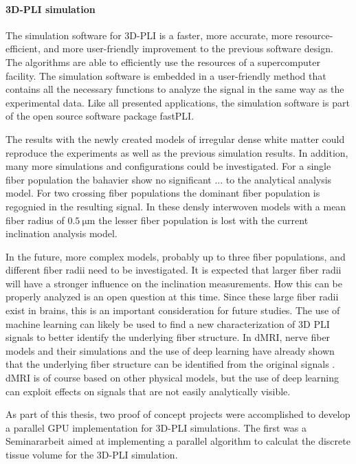 \paragraph{\acs{3D-PLI} simulation} %
The simulation software for \ac{3D-PLI} is a faster, more accurate, more resource-efficient, and more user-friendly improvement to the previous software design.
The algorithms are able to efficiently use the resources of a supercomputer facility.
The simulation software is embedded in a user-friendly \python{} method that contains all the necessary functions to analyze the signal in the same way as the experimental data.
Like all presented applications, the simulation software is part of the open source software package \ac{fastPLI}.
\par
% 
The results with the newly created models of irregular dense white matter could reproduce the experiments as well as the previous simulation results.
In addition, many more simulations and configurations could be investigated.
For a single fiber population the bahavier show no significant ... to the analytical analysis model.
For two crossing fiber populations the dominant fiber population is regognied in the resulting signal.
In these densly interwoven models with a mean fiber radius of $\SI{0.5}{\micro\meter}$ the lesser fiber population is lost with the current inclination analysis model.
\par
% 
In the future, more complex models, probably up to three fiber populations, and different fiber radii need to be investigated.
It is expected that larger fiber radii will have a stronger influence on the inclination measurements.
How this can be properly analyzed is an open question at this time.
Since these large fiber radii exist in brains, this is an important consideration for future studies.
The use of machine learning can likely be used to find a new characterization of 3D PLI signals to better identify the underlying fiber structure.
In \ac{dMRI}, nerve fiber models and their simulations and the use of deep learning have already shown that the underlying fiber structure can be identified from the original signals \cite{ginsburgerDis2019}.
\ac{dMRI} is of course based on other physical models, but the use of deep learning can exploit effects on signals that are not easily analytically visible.
\par
% 
As part of this thesis, two proof of concept projects were accomplished to develop a parallel \ac{GPU} implementation for \ac{3D-PLI} simulations.
The first was a Seminararbeit aimed at implementing a parallel algorithm to calculat the discrete tissue volume for the \ac{3D-PLI} simulation\cite{Kobusch:Seminar}.

